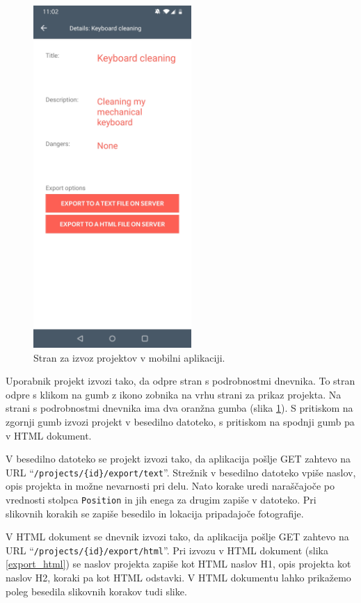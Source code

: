 \documentclass[a4paper, 12pt]{book}
\begin{document}
\begin{figure}[H]
\begin{center}
	\includegraphics[width=6cm]{app_project_export}
\end{center}
	\caption{Stran za izvoz projektov v mobilni aplikaciji.}
\label{app_project_export}
\end{figure}

Uporabnik projekt izvozi tako, da odpre stran s podrobnostmi dnevnika.
To stran odpre s klikom na gumb z ikono zobnika na vrhu strani za prikaz projekta.
Na strani s podrobnostmi dnevnika ima dva oranžna gumba (slika \ref{app_project_export}).
S pritiskom na zgornji gumb izvozi projekt v besedilno datoteko, s pritiskom na spodnji gumb pa v HTML dokument.

V besedilno datoteko se projekt izvozi tako, da aplikacija pošlje GET zahtevo na URL \enquote{\texttt{/projects/\{id\}/export/text}}.
Strežnik v besedilno datoteko vpiše naslov, opis projekta in možne nevarnosti pri delu.
Nato korake uredi naraščajoče po vrednosti stolpca \texttt{Position} in jih enega za drugim zapiše v datoteko.
Pri slikovnih korakih se zapiše besedilo in lokacija pripadajoče fotografije.

V HTML dokument se dnevnik izvozi tako, da aplikacija pošlje GET zahtevo na URL \enquote{\texttt{/projects/\{id\}/export/html}}.
Pri izvozu v HTML dokument (slika \ref{export_html}) se naslov projekta zapiše kot HTML naslov H1, opis projekta kot naslov H2, koraki pa kot HTML odstavki.
V HTML dokumentu lahko prikažemo poleg besedila slikovnih korakov tudi slike.
\end{document}
